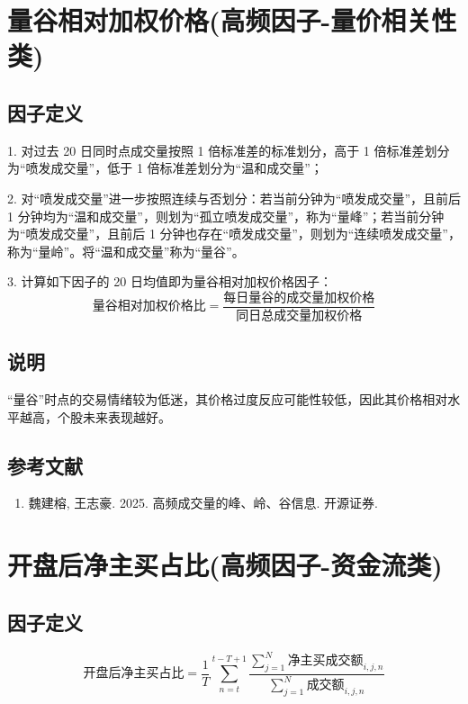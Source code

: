 \documentclass{article}
\begin{document}
\section{量谷相对加权价格(高频因子-量价相关性类)}

\subsection{因子定义}

1. 对过去 20 日同时点成交量按照 1 倍标准差的标准划分，高于 1 倍标准差划分为“喷发成交量”，低于 1 倍标准差划分为“温和成交量”；

2. 对“喷发成交量”进一步按照连续与否划分：若当前分钟为“喷发成交量”，且前后 1 分钟均为“温和成交量”，则划为“孤立喷发成交量”，称为“量峰”；若当前分钟为“喷发成交量”，且前后 1 分钟也存在“喷发成交量”，则划为“连续喷发成交量”，称为“量岭”。将“温和成交量”称为“量谷”。

3. 计算如下因子的 20 日均值即为量谷相对加权价格因子：
\begin{equation}
    \text{量谷相对加权价格比} = \frac{\text{每日量谷的成交量加权价格}}{\text{同日总成交量加权价格}}
\end{equation}

\subsection{说明}
“量谷”时点的交易情绪较为低迷，其价格过度反应可能性较低，因此其价格相对水平越高，个股未来表现越好。

\subsection{参考文献}
\begin{enumerate}
    \item 魏建榕, 王志豪. 2025. 高频成交量的峰、岭、谷信息. 开源证券.
\end{enumerate}

\section{开盘后净主买占比(高频因子-资金流类)}

\subsection{因子定义}


\begin{equation}
    \text{开盘后净主买占比} = \frac{1}{T} \sum_{n=t}^{t-T+1} \frac{\sum_{j=1}^{N} \text{净主买成交额}_{i,j,n}}{\sum_{j=1}^{N} \text{成交额}_{i,j,n}}
\end{equation}
\end{document}
